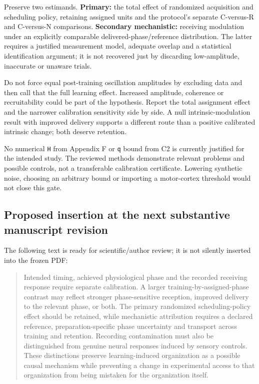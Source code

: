 \documentclass[
  american,
  11pt,
  letterpaper,
]{article}
\begin{document}
Preserve two estimands. \textbf{Primary:} the total effect of randomized acquisition and scheduling policy, retaining assigned units and the protocol's separate C-versus-R and C-versus-N comparisons. \textbf{Secondary mechanistic:} receiving modulation under an explicitly comparable delivered-phase/reference distribution. The latter requires a justified measurement model, adequate overlap and a statistical identification argument; it is not recovered just by discarding low-amplitude, inaccurate or unaware trials.

Do not force equal post-training oscillation amplitudes by excluding data and then call that the full learning effect. Increased amplitude, coherence or recruitability could be part of the hypothesis. Report the total assignment effect and the narrower calibration sensitivity side by side. A null intrinsic-modulation result with improved delivery supports a different route than a positive calibrated intrinsic change; both deserve retention.

No numerical \texttt{H} from Appendix F or \texttt{q} bound from C2 is currently justified for the intended study. The reviewed methods demonstrate relevant problems and possible controls, not a transferable calibration certificate. Lowering synthetic noise, choosing an arbitrary bound or importing a motor-cortex threshold would not close this gate.

\subsection{Proposed insertion at the next substantive manuscript revision}\label{proposed-insertion-at-the-next-substantive-manuscript-revision}

The following text is ready for scientific/author review; it is not silently inserted into the frozen PDF:

\begin{quote}
Intended timing, achieved physiological phase and the recorded receiving response require separate calibration. A larger training-by-assigned-phase contrast may reflect stronger phase-sensitive reception, improved delivery to the relevant phase, or both. The primary randomized scheduling-policy effect should be retained, while mechanistic attribution requires a declared reference, preparation-specific phase uncertainty and transport across training and retention. Recording contamination must also be distinguished from genuine neural responses induced by sensory controls. These distinctions preserve learning-induced organization as a possible causal mechanism while preventing a change in experimental access to that organization from being mistaken for the organization itself.
\end{quote}
\end{document}
